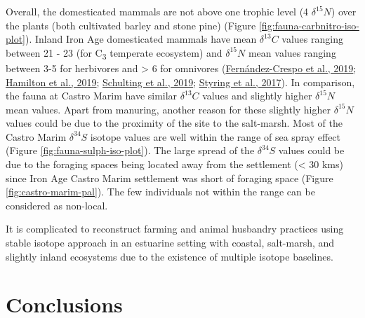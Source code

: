 \documentclass[preprint, 3p, authoryear]{elsarticle} %
\begin{document}
Overall, the domesticated mammals are not above one trophic level (4\text{\textperthousand} \(\delta^{15}N\)) over the plants (both cultivated barley and stone pine) (Figure \ref{fig:fauna-carbnitro-iso-plot}). Inland Iron Age domesticated mammals have mean \(\delta ^{13}C\) values ranging between 21 - 23\text{\textperthousand} (for C\textsubscript{3} temperate ecosystem) and \(\delta ^{15}N\) mean values ranging between 3-5\text{\textperthousand} for herbivores and \textgreater{} 6\text{\textperthousand} for omnivores (\protect\hyperlink{ref-fernandez-crespo_etal19}{Fernández-Crespo et al., 2019}; \protect\hyperlink{ref-hamilton_etal19}{Hamilton et al., 2019}; \protect\hyperlink{ref-schulting_etal19}{Schulting et al., 2019}; \protect\hyperlink{ref-styring_etal17}{Styring et al., 2017}). In comparison, the fauna at Castro Marim have similar \(\delta ^{13}C\) values and slightly higher \(\delta ^{15}N\) mean values. Apart from manuring, another reason for these slightly higher \(\delta^{15}N\) values could be due to the proximity of the site to the salt-marsh. Most of the Castro Marim \(\delta ^{34}S\) isotope values are well within the range of sea spray effect (Figure \ref{fig:fauna-sulph-iso-plot}). The large spread of the \(\delta ^{34}S\) values could be due to the foraging spaces being located away from the settlement (\textless{} 30 kms) since Iron Age Castro Marim settlement was short of foraging space (Figure \ref{fig:castro-marim-pal}). The few individuals not within the range can be considered as non-local.

It is complicated to reconstruct farming and animal husbandry practices using stable isotope approach in an estuarine setting with coastal, salt-marsh, and slightly inland ecosystems due to the existence of multiple isotope baselines.

\hypertarget{conclusions}{%
\section{Conclusions}\label{conclusions}}
\end{document}
